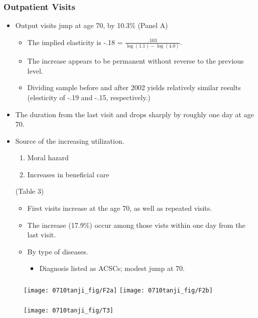 \documentclass[dvipdfmx,11pt]{beamer}
\begin{document}
\begin{frame}\frametitle{Outpatient Visits}
  \begin{itemize}
    \item Output visits junp at age 70, by 10.3\% (Panel A)
    \begin{itemize}
      \item The implied elasticity is -.18 = $\frac{.103}{\log(1.1) - \log(4.0)}$.
      \item The increase appears to be permanent without reverse to the previous level.
      \item Dividing sample before and after 2002 yields relatively similar results (elesticity of -.19 and -.15, respectively.)
    \end{itemize}
    \item The duration from the last visit and drops sharply by roughly one day at age 70.
    \item Source of the increasing utilization.
    \begin{enumerate}
      \item Moral hazard
      \item Increases in beneficial care
    \end{enumerate}
    (Table 3)
    \begin{itemize}
      \item First visits increase at the age 70, as well as repeated visits.
      \item The increase (17.9\%) occur among those vists within one day from the last visit.
      \item By type of diseases.
      \begin{itemize}
        \item Diagnosis listed as ACSCs; modest jump at 70.
      \end{itemize}
    \end{itemize}
  \end{itemize}
\end{frame}

\begin{frame}\frametitle{}
  \begin{figure}[ht]
    \centering
    \texttt{[image: 0710tanji\_fig/F2a]}
    \texttt{[image: 0710tanji\_fig/F2b]}
  \end{figure}
\end{frame}

\begin{frame}\frametitle{}
  \begin{figure}[ht]
    \centering
    \texttt{[image: 0710tanji\_fig/T3]}
  \end{figure}
\end{frame}
\end{document}
